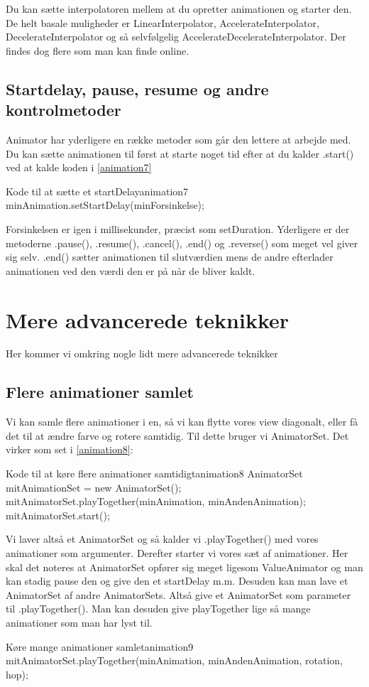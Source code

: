 Du kan sætte interpolatoren mellem at du opretter animationen og starter den.
De helt basale muligheder er LinearInterpolator, AccelerateInterpolator, DecelerateInterpolator og så selvfølgelig AccelerateDecelerateInterpolator. Der findes dog flere som man kan finde online.
\subsection{Startdelay, pause, resume og andre kontrolmetoder}
Animator har yderligere en række metoder som går den lettere at arbejde med. Du kan sætte animationen til først at starte noget tid efter at du kalder .start() ved at kalde koden i \autoref{animation7} \\
\begin{JavaCode}{Kode til at sætte et startDelay}{animation7}
	minAnimation.setStartDelay(minForsinkelse);
\end{JavaCode}
Forsinkelsen er igen i millisekunder, præcist som setDuration. 
Yderligere er der metoderne .pause(), .resume(), .cancel(),  .end() og .reverse() som meget vel giver sig selv. .end() sætter animationen til slutværdien mens de andre efterlader animationen ved den værdi den er på når de bliver kaldt.
\section{Mere advancerede teknikker}
Her kommer vi omkring nogle lidt mere advancerede teknikker
\subsection{Flere animationer samlet}
Vi kan samle flere animationer i en, så vi kan flytte vores view diagonalt, eller få det til at ændre farve og rotere samtidig. Til dette bruger vi AnimatorSet. Det virker som set i \autoref{animation8}:
\begin{JavaCode}{Kode til at køre flere animationer samtidigt}{animation8}
AnimatorSet mitAnimationSet = new AnimatorSet();
mitAnimatorSet.playTogether(minAnimation, minAndenAnimation);
mitAnimatorSet.start();
\end{JavaCode}
Vi laver altså et AnimatorSet og så kalder vi .playTogether() med vores animationer som argumenter. Derefter starter vi vores sæt af animationer. Her skal det noteres at AnimatorSet opfører sig meget ligesom ValueAnimator og man kan stadig pause den og give den et startDelay m.m. 
Desuden kan man lave et AnimatorSet af andre AnimatorSets. Altså give et AnimatorSet som parameter til .playTogether(). Man kan desuden give playTogether lige så mange animationer som man har lyst til.
\begin{JavaCode}{Køre mange animationer samlet}{animation9}
	mitAnimatorSet.playTogether(minAnimation, minAndenAnimation, rotation, hop);
\end{JavaCode}

